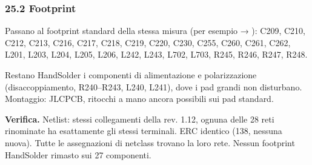 \subsubsection[25.2 Footprint]{25.2 Footprint}

Passano al footprint standard della stessa misura (per esempio  → ): C209, C210, C212, C213, C216, C217, C218, C219, C220, C230, C255, C260, C261, C262, L201, L203, L204, L205, L206, L242, L243, L702, L703, R245, R246, R247, R248.

Restano HandSolder i componenti di alimentazione e polarizzazione (disaccoppiamento, R240–R243, L240, L241), dove i pad grandi non disturbano. Montaggio: JLCPCB, ritocchi a mano ancora possibili sui pad standard.

\textbf{Verifica.} Netlist: stessi collegamenti della rev. 1.12, ognuna delle 28 reti rinominate ha esattamente gli stessi terminali. ERC identico (138, nessuna nuova). Tutte le assegnazioni di netclass trovano la loro rete. Nessun footprint HandSolder rimasto sui 27 componenti.

